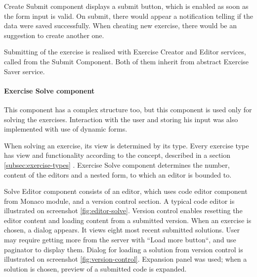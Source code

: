                 Create Submit component displays a submit button, which is enabled as soon as the form input is valid. On submit, there would appear a notification telling if the data were saved successfully. When cheating new exercise, there would be an suggestion to create another one.
                
                Submitting of the exercise is realised with Exercise Creator and Editor services, called from the Submit Component. Both of them inherit from abstract Exercise Saver service.
    
                \paragraph{Exercise Solve component}
                This component has a complex structure too, but this component is used only for solving the exercises. Interaction with the user and storing his input was also implemented with use of dynamic forms.
                
                When solving an exercise, its view is determined by its type. Every exercise type has view and functionality according to the concept, described in a section \ref{subsec:exercise-types} . Exercise Solve component determines the number, content of the editors and a nested form, to which an editor is bounded to.
                
                Solve Editor component consists of an editor, which uses code editor component from Monaco module, and a version control section. A typical code editor is illustrated on screenshot \ref{fig:editor-solve}. Version control enables resetting the editor content and loading content from a submitted version. When an exercise is chosen, a dialog appears. It views eight most recent submitted solutions. User may require getting more from the server with ``Load more button``, and use paginator to display them. Dialog for loading a solution from version control is illustrated on screenshot \ref{fig:version-control}. Expansion panel was used; when a solution is chosen, preview of a submitted code is expanded.
                
